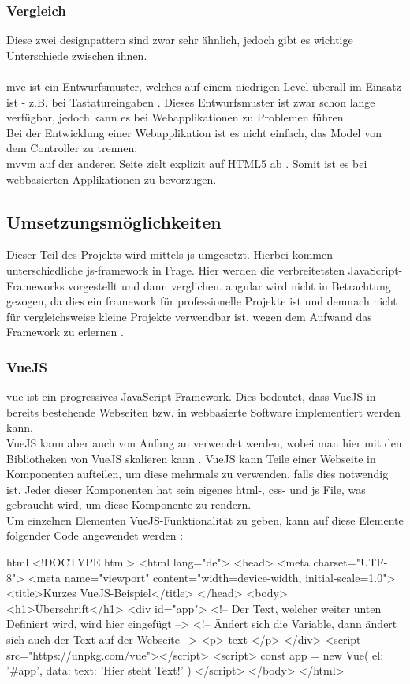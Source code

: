 \subsubsection{Vergleich}
Diese zwei \Gls{designpattern} sind zwar sehr ähnlich, jedoch gibt es wichtige Unterschiede zwischen ihnen.\\\\
\Gls{mvc} ist ein Entwurfsmuster, welches auf einem niedrigen Level überall im Einsatz ist - z.B. bei Tastatureingaben \cite{mvc}. Dieses Entwurfsmuster ist zwar schon lange verfügbar, jedoch kann es bei Webapplikationen zu Problemen führen.\\
Bei der Entwicklung einer Webapplikation ist es nicht einfach, das Model von dem Controller zu trennen.\\
\Gls{mvvm} auf der anderen Seite zielt explizit auf HTML5 ab \cite{mvvm_vue}. Somit ist es bei webbasierten Applikationen zu bevorzugen.
\subsection{Umsetzungsmöglichkeiten}
Dieser Teil des Projekts wird mittels \Gls{js} umgesetzt. Hierbei kommen unterschiedliche \Gls{js}-\Gls{framework} in Frage. Hier werden die verbreitetsten JavaScript-Frameworks vorgestellt und dann verglichen. \Gls{angular} wird nicht in Betrachtung gezogen, da dies ein \Gls{framework} für professionelle Projekte ist und demnach nicht für vergleichsweise kleine Projekte verwendbar ist, wegen dem Aufwand das Framework zu erlernen \cite{angular_ex}.
\subsubsection{VueJS}
\gls{vue} ist ein progressives JavaScript-Framework. Dies bedeutet, dass VueJS in bereits bestehende Webseiten bzw. in webbasierte Software implementiert werden kann.\\
VueJS kann aber auch von Anfang an verwendet werden, wobei man hier mit den Bibliotheken von VueJS skalieren kann \cite{vuedoc}. VueJS kann Teile einer Webseite in Komponenten aufteilen, um diese mehrmals zu verwenden, falls dies notwendig ist. Jeder dieser Komponenten hat sein eigenes \Gls{html}-, \Gls{css}- und \Gls{js} File, was gebraucht wird, um diese Komponente zu rendern.\\
Um einzelnen Elementen VueJS-Funktionalität zu geben, kann auf diese Elemente folgender Code angewendet werden \cite{vuedoc}:
\begin{code}{html}
	<!DOCTYPE html>
	<html lang="de">
		<head>
			<meta charset="UTF-8">
			<meta name="viewport" content="width=device-width, initial-scale=1.0">
			<title>Kurzes VueJS-Beispiel</title>
		</head>
		<body>
			<h1>Überschrift</h1>
			<div id="app">
				<!-- Der Text, welcher weiter unten Definiert wird, wird hier eingefügt -->
				<!-- Ändert sich die Variable, dann ändert sich auch der Text auf der Webseite -->
				<p> {{ text }} </p>
			</div>
			<script src="https://unpkg.com/vue"></script>
			<script>
				const app = new Vue({
					el: '#app',
					data: {
						text: 'Hier steht Text!'
					}
				})
			</script>
		</body>
	</html>
\end{code}
